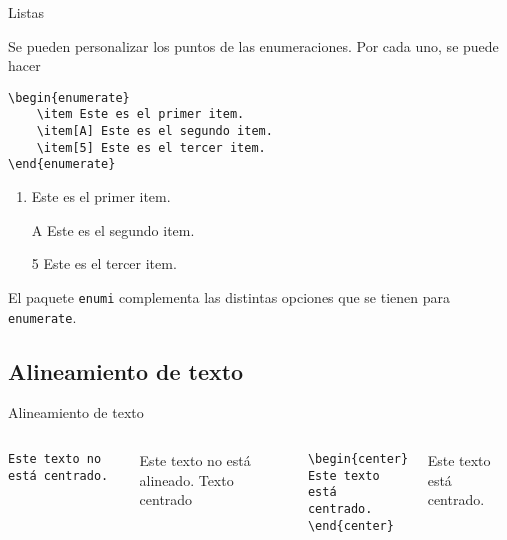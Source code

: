 \documentclass[../slides.tex]{subfiles}
\begin{document}
    \begin{frame}[fragile]{Listas}
        
    Se pueden personalizar los puntos de las enumeraciones. Por cada uno, se puede hacer
            \begin{verbatim}
\begin{enumerate}
    \item Este es el primer item.
    \item[A] Este es el segundo item.
    \item[5] Este es el tercer item.
\end{enumerate}
            \end{verbatim}
            \begin{enumerate}
                \item Este es el primer item.
                \item[A] Este es el segundo item.
                \item[5] Este es el tercer item.
            \end{enumerate}
    \begin{block}{}
    	El paquete \texttt{enumi} complementa las distintas opciones que se tienen para \texttt{enumerate}.
    \end{block}

    \end{frame}
    
    \subsection{Alineamiento de texto}
    \begin{frame}[fragile]{Alineamiento de texto}
        \begin{columns}
                \begin{verbatim}
Este texto no está centrado.
                \end{verbatim}
Este texto no está alineado.
                Texto centrado
                    \begin{verbatim}
\begin{center}
Este texto está centrado.
\end{center}
                    \end{verbatim}
\begin{center}
Este texto está centrado.
\end{center}
        \end{columns}
    \end{frame}
\end{document}
